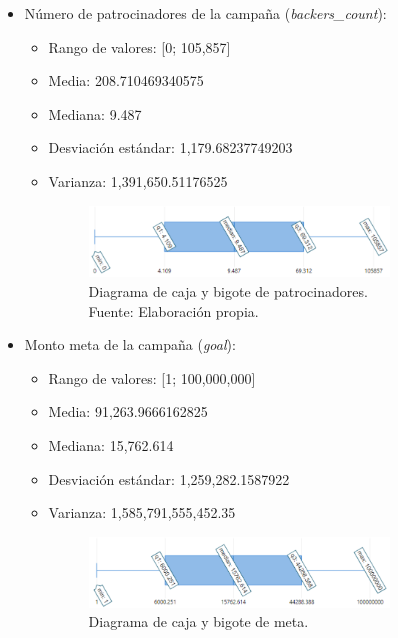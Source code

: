 \begin{itemize}
	\item Número de patrocinadores de la campaña (\textit{backers\_count}):
	\begin{itemize}
		\item Rango de valores: [0; 105,857]
		\item Media: 208.710469340575
		\item Mediana: 9.487
		\item Desviación estándar: 1,179.68237749203
		\item Varianza: 1,391,650.51176525
		\begin{figure}[!ht]
			\begin{center}
				\includegraphics[width=0.80\textwidth]{4/figures/caja_bigote_backers.png}
				\caption[Diagrama de caja y bigote de patrocinadores]{Diagrama de caja y bigote de patrocinadores.\\
					Fuente: Elaboración propia.}
				\label{4:fig12}
			\end{center}
		\end{figure}
	\end{itemize}
	\item Monto meta de la campaña (\textit{goal}):
	\begin{itemize}
		\item Rango de valores: [1; 100,000,000]
		\item Media: 91,263.9666162825
		\item Mediana: 15,762.614
		\item Desviación estándar: 1,259,282.1587922
		\item Varianza: 1,585,791,555,452.35
		\begin{figure}[!ht]
			\begin{center}
				\includegraphics[width=0.80\textwidth]{4/figures/caja_bigote_goal.png}
				\caption[Diagrama de caja y bigote de meta]{Diagrama de caja y bigote de meta.\\
}
\end{center}
\end{figure}
\end{itemize}
\end{itemize}
